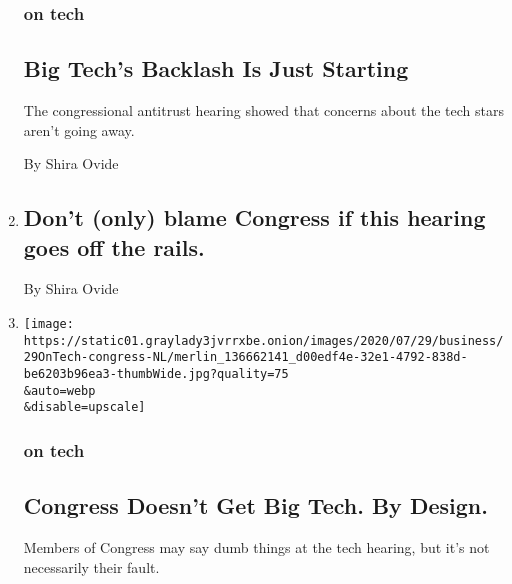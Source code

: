\begin{enumerate}
  \hypertarget{on-tech-2}{%
  \subsubsection{on tech}\label{on-tech-2}}

  \hypertarget{big-techs-backlash-is-just-starting}{%
  \subsection{Big Tech's Backlash Is Just
  Starting}\label{big-techs-backlash-is-just-starting}}

  The congressional antitrust hearing showed that concerns about the
  tech stars aren't going away.

  By Shira Ovide
\item
  \href{/live/2020/07/29/technology/tech-ceos-hearing-testimony/dont-only-blame-congress-if-this-hearing-goes-off-the-rails}{}

  \hypertarget{dont-only-blame-congress-if-this-hearing-goes-off-the-rails}{%
  \subsection{Don't (only) blame Congress if this hearing goes off the
  rails.}\label{dont-only-blame-congress-if-this-hearing-goes-off-the-rails}}

  By Shira Ovide
\item
  \href{/2020/07/29/technology/congress-big-tech.html}{}

  \texttt{[image: https://static01.graylady3jvrrxbe.onion/images/2020/07/29/business/29OnTech-congress-NL/merlin\_136662141\_d00edf4e-32e1-4792-838d-be6203b96ea3-thumbWide.jpg?quality=75\\\&auto=webp\\\&disable=upscale]}

  \hypertarget{on-tech-3}{%
  \subsubsection{on tech}\label{on-tech-3}}

  \hypertarget{congress-doesnt-get-big-tech-by-design}{%
  \subsection{Congress Doesn't Get Big Tech. By
  Design.}\label{congress-doesnt-get-big-tech-by-design}}

  Members of Congress may say dumb things at the tech hearing, but it's
  not necessarily their fault.


\end{enumerate}
